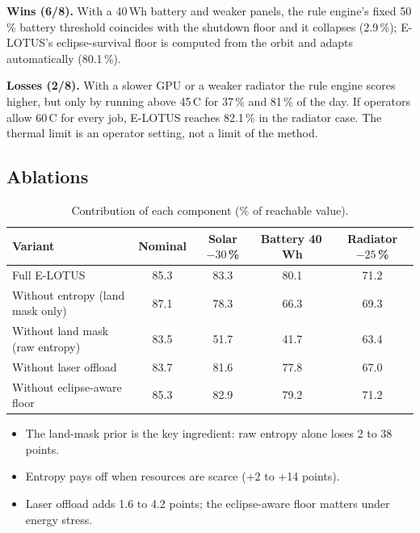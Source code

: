 \documentclass[11pt,a4paper]{article}
\begin{document}
\textbf{Wins (6/8).} With a 40\,Wh battery and weaker panels, the rule engine's fixed 50\,\% battery
threshold coincides with the shutdown floor and it collapses (2.9\,\%); E-LOTUS's eclipse-survival floor
is computed from the orbit and adapts automatically (80.1\,\%).

\textbf{Losses (2/8).} With a slower GPU or a weaker radiator the rule engine scores higher, but only by
running above 45\,\textdegree C for 37\,\% and 81\,\% of the day. If operators allow 60\,\textdegree C for every
job, E-LOTUS reaches 82.1\,\% in the radiator case. The thermal limit is an operator setting, not a limit of
the method.

\subsection{Ablations}
\begin{table}[H]
\centering
\caption{Contribution of each component (\% of reachable value).}
\small
\begin{tabular}{@{}lcccc@{}}
\toprule
\textbf{Variant} & \textbf{Nominal} & \textbf{Solar $-30$\,\%} & \textbf{Battery 40\,Wh} & \textbf{Radiator $-25$\,\%} \\
\midrule
Full E-LOTUS & 85.3 & 83.3 & 80.1 & 71.2 \\
Without entropy (land mask only) & 87.1 & 78.3 & 66.3 & 69.3 \\
Without land mask (raw entropy) & 83.5 & 51.7 & 41.7 & 63.4 \\
Without laser offload & 83.7 & 81.6 & 77.8 & 67.0 \\
Without eclipse-aware floor & 85.3 & 82.9 & 79.2 & 71.2 \\
\bottomrule
\end{tabular}
\end{table}
\begin{itemize}
  \item The land-mask prior is the key ingredient: raw entropy alone loses 2 to 38 points.
  \item Entropy pays off when resources are scarce (+2 to +14 points).
  \item Laser offload adds 1.6 to 4.2 points; the eclipse-aware floor matters under energy stress.
\end{itemize}

\end{document}
